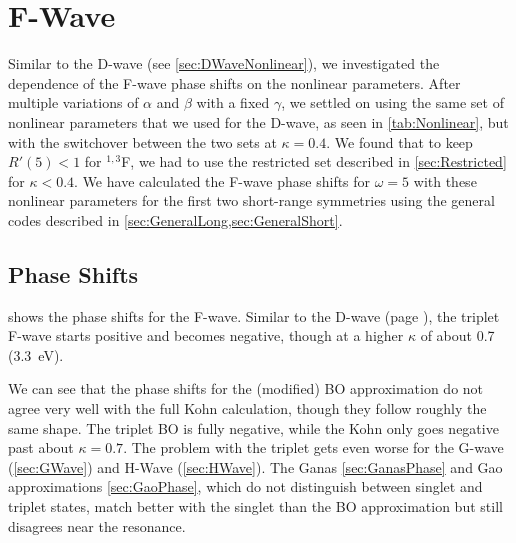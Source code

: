 \documentclass[Dissertation.tex]{subfiles}
\begin{document}
\section{F-Wave}
\label{sec:FWave}

Similar to the D-wave (see \cref{sec:DWaveNonlinear}), we investigated the
dependence of the F-wave phase shifts on the nonlinear parameters.
After multiple variations of $\alpha$ and
$\beta$ with a fixed $\gamma$, we settled on using the same set of nonlinear
parameters that we used for the D-wave, as seen in \cref{tab:Nonlinear}, but
with the switchover between the two sets at $\kappa = 0.4$.
We found that to keep $R'(5) < 1$ for $^{1,3}$F, we had to use the 
restricted set described in \cref{sec:Restricted} for $\kappa < 0.4$.
We have calculated the F-wave phase shifts for $\omega = 5$ with these nonlinear
parameters for the first two short-range symmetries using the general codes
described in \cref{sec:GeneralLong,sec:GeneralShort}.

\label{sec:FNonlinear}

\subsection{Phase Shifts}
\label{sec:FWavePhase}

 shows the phase shifts for the F-wave.
Similar to the D-wave (page \pageref{DWaveSwitch}), the triplet F-wave starts
positive and becomes negative, though at a higher $\kappa$ of about 0.7
(\SI{3.3}{eV}).

We can see that the phase shifts for the (modified) BO approximation do not 
agree very well with the full Kohn calculation, though they follow roughly 
the same shape. The triplet BO is fully negative, while the Kohn only goes 
negative past about $\kappa = 0.7$. The problem with the triplet gets even 
worse for the G-wave (\cref{sec:GWave}) and H-Wave (\cref{sec:HWave}).
The Ganas \cref{sec:GanasPhase} and Gao approximations \cref{sec:GaoPhase},
which do not distinguish
between singlet and triplet states, match better with the singlet than the
BO approximation but still disagrees near the resonance.
\end{document}
